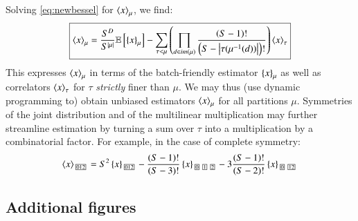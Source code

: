         Solving \ref{eq:newbessel} for $\left\langle x\right\rangle_\mu$, we find:
        \begin{equation*}
            \text{\fbox{$
            \left\langle x\right\rangle_\mu
            =
            \frac{S^D}{S^{\left|\mu\right|}}
            \mathbb{E}\left[
                \left\{x\right\}_\mu
            \right]
            -
            \sum_{\tau < \mu} \left(
                \prod_{d\in im(\mu)}
                \frac{\left(S-1\right)!}{\left(S-\left|\tau(\mu^{-1}(d))\right|\right)!}
            \right)
            \left\langle x\right\rangle_\tau
            $}}
        \end{equation*}
        This expresses $\left\langle x\right\rangle_\mu$ in terms of the batch-friendly estimator
        $\left\{x\right\}_\mu$ as well as correlators $\left\langle x\right\rangle_\tau$ for $\tau$
        \emph{strictly} finer than $\mu$.  We may thus (use dynamic programming
        to) obtain unbiased estimators $\left\langle x\right\rangle_\mu$ for all partitions $\mu$.
        Symmetries of the joint distribution and of the multilinear
        multiplication may further streamline estimation by turning a sum over
        $\tau$ into a multiplication by a combinatorial factor.  For example,
        in the case of complete symmetry:
        $$
            \wang{x}_{\partitionbox{012}}
            =
            S^2
            \wurl{x}_{\partitionbox{012}}
            -
            \frac{(S-1)!}{(S-3)!}
            \wurl{x}_{\partitionbox{0}\partitionbox{1}\partitionbox{2}}
            -
            3\frac{(S-1)!}{(S-2)!}
            \wurl{x}_{\partitionbox{0}\partitionbox{12}}
        $$

    \subsection{Additional figures}                                 \label{appendix:figures}

